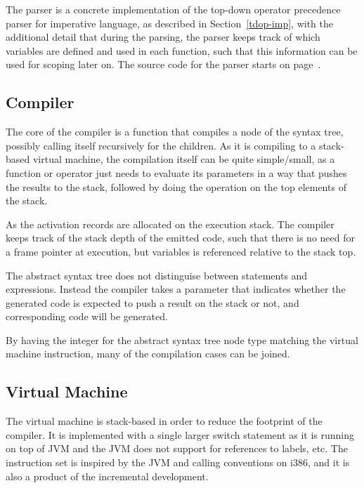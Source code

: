 \documentclass[11pt]{report}
\begin{document}
The parser is a concrete implementation of the top-down operator precedence parser for imperative language, as described in Section~\ref{tdop-imp}, with the additional detail that during the parsing, the parser keeps track of which variables are defined and used in each function, such that this information can be used for scoping later on. 
The source code for the parser starts on page~\pageref{code-lightscript-parser}.

\subsection{Compiler}

The core of the compiler is a function that compiles a node of the syntax tree, possibly calling itself recursively for the children.
As it is compiling to a stack-based virtual machine, the compilation itself can be quite simple/small, as a function or operator just needs to evaluate its parameters in a way that pushes the results to the stack, followed by doing the operation on the top elements of the stack.

As the activation records are allocated on the execution stack. The compiler keeps track of the stack depth of the emitted code, such that there is no need for a frame pointer at execution, but variables is referenced relative to the stack top.

The abstract syntax tree does not distinguise between statements and expressions. Instead the compiler takes a parameter that indicates whether the generated code is expected to push a result on the stack or not, and corresponding code will be generated. 

By having the integer for the abstract syntax tree node type matching the virtual machine instruction, many of the compilation cases can be joined.


\subsection{Virtual Machine}
The virtual machine is stack-based in order to reduce the footprint of the compiler.
It is implemented with a single larger switch statement as it is running on top of JVM and the JVM does not support for references to labels, etc.
The instruction set is inspired by the JVM and calling conventions on i386, and it is also a product of the incremental development.
\end{document}
